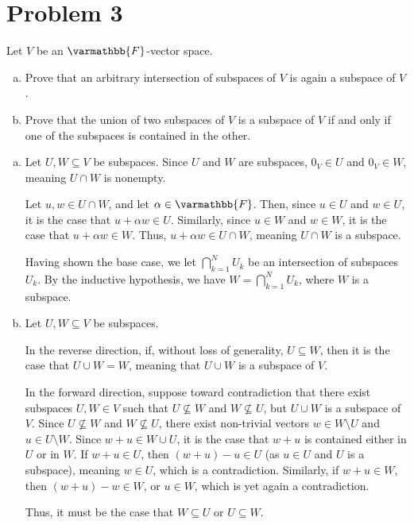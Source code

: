 \documentclass[10pt]{mypackage}
\renewcommand*{\mathbb}[1]{\varmathbb{#1}}
\begin{document}
\section{Problem 3}%
\begin{problem}
  Let $V$ be an $\mathbb{F}$-vector space.
  \begin{enumerate}[(a)]
    \item Prove that an arbitrary intersection of subspaces of $V$ is again a subspace of $V$.
    \item Prove that the union of two subspaces of $V$ is a subspace of $V$ if and only if one of the subspaces is contained in the other.
  \end{enumerate}
\end{problem}
\begin{solution}\hfill
  \begin{enumerate}[(a)]
    \item Let $U,W\subseteq V$ be subspaces. Since $U$ and $W$ are subspaces, $0_V \in U$ and $0_V \in W$, meaning $U\cap W$ is nonempty.\newline

      Let $u,w\in U\cap W$, and let $\alpha \in \mathbb{F}$. Then, since $u\in U$ and $w\in U$, it is the case that $u + \alpha w \in U$. Similarly, since $u\in W$ and $w\in W$, it is the case that $u + \alpha w \in W$. Thus, $u + \alpha w\in U\cap W$, meaning $U\cap W$ is a subspace.\newline

      Having shown the base case, we let $\bigcap_{k=1}^{N} U_k$ be an intersection of subspaces $U_k$. By the inductive hypothesis, we have $W = \bigcap_{k=1}^{N}U_k$, where $W$ is a subspace. 
    \item Let $U,W\subseteq V$ be subspaces.\newline

      In the reverse direction, if, without loss of generality, $U\subseteq W$, then it is the case that $U\cup W = W$, meaning that $U\cup W$ is a subspace of $V$.\newline

      In the forward direction, suppose toward contradiction that there exist subspaces $U,W\in V$ such that $U\nsubseteq W$ and $W\nsubseteq U$, but $U\cup W$ is a subspace of $V$. Since $U\nsubseteq W$ and $W\nsubseteq U$, there exist non-trivial vectors $w\in W\setminus U$ and $u\in U\setminus W$. Since $w + u\in W\cup U$, it is the case that $w + u$ is contained either in $U$ or in $W$. If $w + u\in U$, then $\left(w + u\right)-u \in U$ (as $u\in U$ and $U$ is a subspace), meaning $w\in U$, which is a contradiction. Similarly, if $w + u \in W$, then $\left(w + u\right)-w \in W$, or $u\in W$, which is yet again a contradiction.\newline

      Thus, it must be the case that $W\subseteq U$ or $U\subseteq W$.
  \end{enumerate}
\end{solution}
\end{document}
